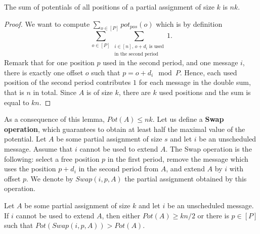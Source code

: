 \documentclass[a4paper,UKenglish,cleveref, autoref, thm-restate]{lipics-v2019}
\begin{document}
\begin{lemma}\label{lemma:inv}
The sum of potentials of all positions of a partial assignment of size $k$ is $nk$.  
\end{lemma}
\begin{proof}
We want to compute $\sum_{o \in [P]} pot_{pos}(o)$ which is by definition
$$\sum_{o \in [P]} \sum_{\substack {i \in [n],\, o + d_i \text{ is used} \\ \text{in the second period}}} 1.$$
Remark that for one position $p$ used in the second period, and one message $i$, there is exactly one offset $o$ such that $p = o+d_i \mod P$.
Hence, each used position of the second period contributes $1$ for each message in the double sum, that is $n$ in total.
Since $A$ is of size $k$, there are $k$ used positions and the sum is equal to $kn$.
\end{proof}

 As a consequence of this lemma, $Pot(A) \leq nk$. Let us define a \textbf{Swap operation}, which guarantees to obtain at least half the maximal value of the potential. Let $A$ be some partial assignment of size $s$ and let $i$ be an unscheduled message. Assume that $i$ cannot be used to extend $A$. The Swap operation is the following: 
select a free position $p$ in the first period, remove the message which uses the position $p+d_i$ in the second period from $A$, and extend $A$ by $i$ with offset $p$. We denote by $Swap(i,p,A)$ the partial assignment obtained by this operation.

\begin{lemma}\label{lemma:swap}
Let $A$ be some partial assignment of size $k$ and let $i$ be an unscheduled message. If $i$ cannot be used to extend $A$, then either $Pot(A) \geq kn/2$ or there is $p \in [P]$ such that $Pot(Swap(i,p,A)) > Pot(A)$.
\end{lemma}
\end{document}
